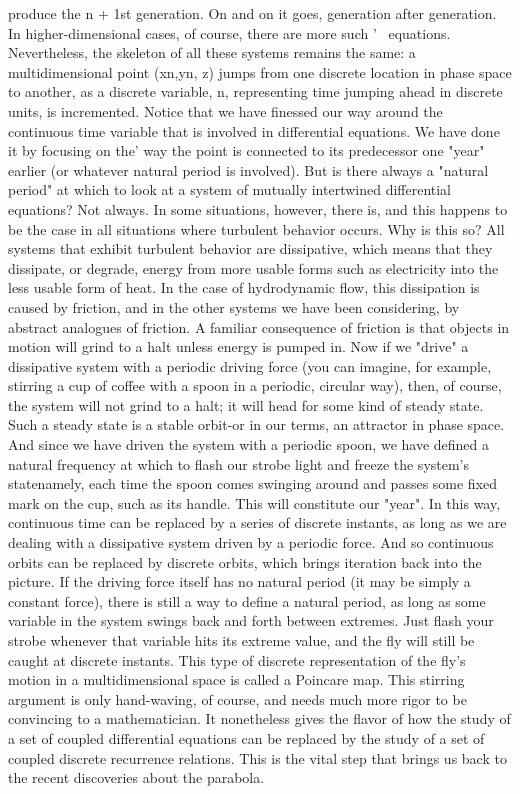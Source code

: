 produce the n + 1st generation. On and on it goes, generation after generation. In
higher-dimensional cases, of course, there are more such '~ equations. Nevertheless,
the skeleton of all these systems remains the same: a multidimensional point (xn,yn,
z) jumps from one discrete location in phase space to another, as a discrete variable, n,
representing time jumping ahead in discrete units, is incremented.
        Notice that we have finessed our way around the continuous time variable that
is involved in differential equations. We have done it by focusing on the' way the
point is connected to its predecessor one "year" earlier (or whatever natural period is
involved). But is there always a "natural period" at which to look at a system of
mutually intertwined differential equations? Not always. In some situations, however,
there is, and this happens to be the case in all situations where turbulent behavior
occurs.
        Why is this so? All systems that exhibit turbulent behavior are dissipative,
which means that they dissipate, or degrade, energy from more usable forms such as
electricity into the less usable form of heat. In the case of hydrodynamic flow, this
dissipation is caused by friction, and in the other systems we have been considering,
by abstract analogues of friction. A familiar consequence of friction is that objects in
motion will grind to a halt unless energy is pumped in. Now if we "drive" a
dissipative system with a periodic driving force (you can imagine, for example,
stirring a cup of coffee with a spoon in a periodic, circular way), then, of course, the
system will not grind to a halt; it will head for some kind of steady state. Such a
steady state is a stable orbit-or in our terms, an attractor in phase space. And since we
have driven the system with a periodic spoon, we have defined a natural frequency at
which to flash our strobe light and freeze the system's statenamely, each time the
spoon comes swinging around and passes some fixed mark on the cup, such as its
handle. This will constitute our "year". In this way, continuous time can be replaced
by a series of discrete instants, as long as we are dealing with a dissipative system
driven by a periodic force. And so continuous orbits can be replaced by discrete
orbits, which brings iteration back into the picture.
        If the driving force itself has no natural period (it may be simply a constant
force), there is still a way to define a natural period, as long as some variable in the
system swings back and forth between extremes. Just flash your strobe whenever that
variable hits its extreme value, and the fly will still be caught at discrete instants. This
type of discrete representation of the fly's motion in a multidimensional space is
called a Poincare map.
        This stirring argument is only hand-waving, of course, and needs much more
rigor to be convincing to a mathematician. It nonetheless gives the flavor of how the
study of a set of coupled differential equations can be replaced by the study of a set of
coupled discrete recurrence relations. This is the vital step that brings us back to the
recent discoveries about the parabola.

